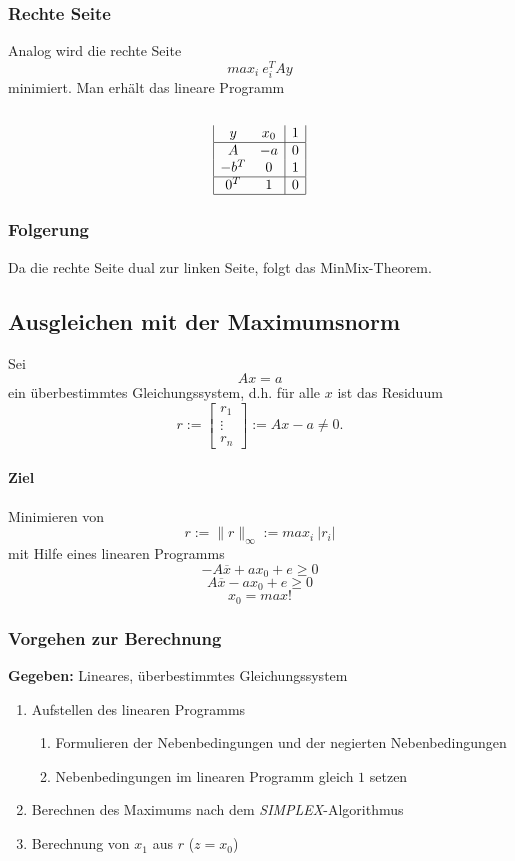 \subsubsection{Rechte Seite}
Analog wird die rechte Seite
\[max_i~e_i^T A y\]
minimiert. Man erhält das lineare Programm
\\\\
\[\begin{array}{|cc|c|}
y & x_0 & 1 \\
\hline
A & -a & 0 \\
-b^T & 0 & 1 \\
\hline
0^T & 1 & 0 \\
\hline
\end{array}\]

\subsubsection{Folgerung}
Da die rechte Seite dual zur linken Seite, folgt das MinMix-Theorem.


\subsection{Ausgleichen mit der Maximumsnorm}
Sei
\[Ax = a\]
ein überbestimmtes Gleichungssystem, d.h. für alle \(x\) ist das Residuum
\[r := \begin{bmatrix} r_1 \\ \vdots \\ r_n \end{bmatrix} := Ax - a \ne 0.\]
\paragraph{Ziel} Minimieren von
\[r := \parallel r \parallel_{\infty} := max_i~|r_i|\]
mit Hilfe eines linearen Programms
\[-A\overline{x} + ax_0 + e \geq 0\]
\[A\overline{x} - ax_0 + e \geq 0\]
\[x_0 = max!\]

\subsubsection{Vorgehen zur Berechnung}
\textbf{Gegeben:} Lineares, überbestimmtes Gleichungssystem
\begin{enumerate}
	\item Aufstellen des linearen Programms
	\begin{enumerate}
		\item Formulieren der Nebenbedingungen und der negierten Nebenbedingungen
		\item Nebenbedingungen im linearen Programm gleich \(1\) setzen
	\end{enumerate}
	\item Berechnen des Maximums nach dem \textit{SIMPLEX}-Algorithmus
	\item Berechnung von \(x_1\) aus \(r\) (\(z = x_0\))
\end{enumerate}


